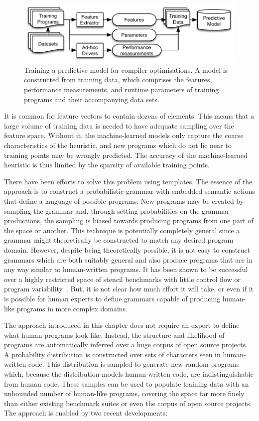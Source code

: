 \begin{figure}
  \includegraphics[width=\columnwidth]{img/overview-a}%
  \caption[Training a predictive model for compiler optimisations]{Training a predictive model for compiler optimisations. A model is constructed from training data, which comprises the features, performance measurements, and runtime parameters of training programs and their accompanying data sets.}%
  \label{fig:training-a-predictive-model}
\end{figure}

It is common for feature vectors to contain dozens of elements. This means that a large volume of training data is needed to have adequate sampling over the feature space. Without it, the machine-learned models only capture the coarse characteristics of the heuristic, and new programs which do not lie near to training points may be wrongly predicted. The accuracy of the machine-learned heuristic is thus limited by the sparsity of available training points.

There have been efforts to solve this problem using templates. The essence of the approach is to construct a probabilistic grammar with embedded semantic actions that define a language of possible programs. New programs may be created by sampling the grammar and, through setting probabilities on the grammar productions, the sampling is biased towards producing programs from one part of the space or another. This technique is potentially completely general since a grammar might theoretically be constructed to match any desired program domain. However, despite being theoretically possible, it is not easy to construct grammars which are both suitably general and also produce programs that are in any way similar to human-written programs. It has been shown to be successful over a highly restricted space of stencil benchmarks with little control flow or program variability~\cite{Falch2015,Cummins2016a}. But, it is not clear how much effort it will take, or even if it is possible for human experts to define grammars capable of producing human-like programs in more complex domains.

The approach introduced in this chapter does not require an expert to define what human programs look like. Instead, the structure and likelihood of programs are automatically inferred over a huge corpus of open source projects. A probability distribution is constructed over sets of characters seen in human-written code. This distribution is sampled to generate new random programs which, because the distribution models human-written code, are indistinguishable from human code. These samples can be used to populate training data with an unbounded number of human-like programs, covering the space far more finely than either existing benchmark suites or even the corpus of open source projects. The approach is enabled by two recent developments:

